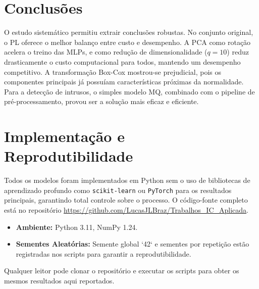 \documentclass[11pt,a4paper]{article}
\begin{document}
\section{Conclusões}

O estudo sistemático permitiu extrair conclusões robustas. No conjunto original, o PL oferece o melhor balanço entre custo e desempenho. A PCA como rotação acelera o treino das MLPs, e como redução de dimensionalidade (\(q=10\)) reduz drasticamente o custo computacional para todos, mantendo um desempenho competitivo. A transformação Box-Cox mostrou-se prejudicial, pois os componentes principais já possuíam características próximas da normalidade. Para a detecção de intrusos, o simples modelo MQ, combinado com o pipeline de pré-processamento, provou ser a solução mais eficaz e eficiente.

\section{Implementação e Reprodutibilidade}
Todos os modelos foram implementados em Python sem o uso de bibliotecas de aprendizado profundo como \texttt{scikit-learn} ou \texttt{PyTorch} para os resultados principais, garantindo total controle sobre o processo. O código-fonte completo está no repositório \url{https://github.com/LucasJLBraz/Trabalhos_IC_Aplicada}.
\begin{itemize}
    \item \textbf{Ambiente:} Python 3.11, NumPy 1.24.
    \item \textbf{Sementes Aleatórias:} Semente global `42` e sementes por repetição estão registradas nos scripts para garantir a reprodutibilidade.
\end{itemize}
Qualquer leitor pode clonar o repositório e executar os scripts para obter os mesmos resultados aqui reportados.
\end{document}
